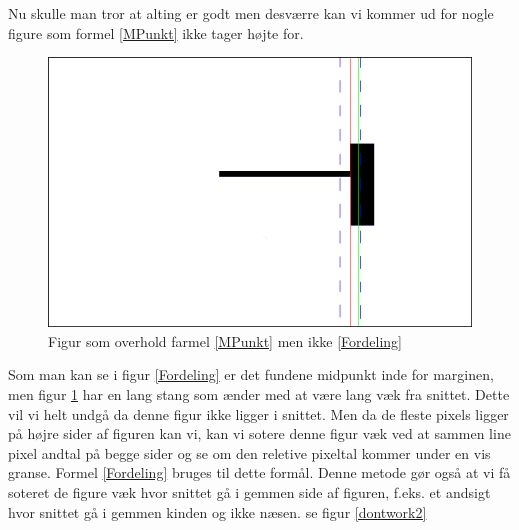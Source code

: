 Nu skulle man tror at alting er godt men desværre kan vi kommer ud for
nogle figure som formel \ref{MPunkt} ikke tager højte for.

\begin{figure}[h]
	\begin{center}
		\includegraphics[scale=0.5,angle=0]{afsnit/vores_implementation/billeder/udvidet_loesning/dontWork.png}
	\end{center}
	\caption[]{Figur som overhold farmel \ref{MPunkt} men ikke \ref{Fordeling}}
	\label{dontwork}
\end{figure}

Som man kan se i figur \ref{Fordeling} er det fundene midpunkt inde for
marginen, men figur \ref{dontwork} har en lang stang som ænder med at
være lang væk fra snittet. Dette vil vi helt undgå da denne figur ikke
ligger i snittet. Men da de fleste pixels ligger på højre sider af
figuren kan vi, kan vi sotere denne figur væk ved at sammen line pixel
andtal på begge sider og se om den reletive pixeltal kommer under en vis
granse. Formel \ref{Fordeling} bruges til dette formål. Denne metode gør
også at vi få soteret de figure væk hvor snittet gå i gemmen side af
figuren, f.eks. et andsigt hvor snittet gå i gemmen kinden og ikke
næsen. se figur \ref{dontwork2}

